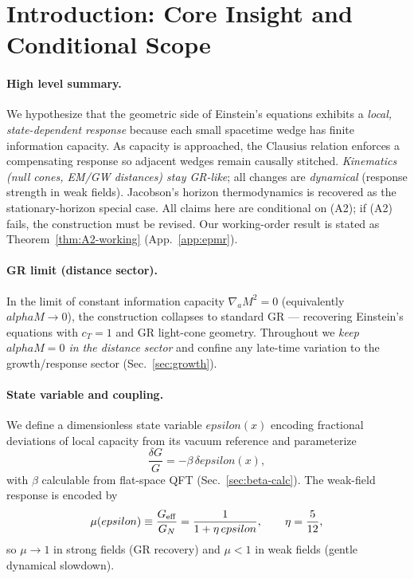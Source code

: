 \documentclass[aps,prd,onecolumn,superscriptaddress,nofootinbib]{revtex4-2}
\def\alphaM{alphaM}%
\def\eps{epsilon}%
\newcommand{\alphaM}{\alpha_M}
\newcommand{\eps}{\varepsilon}
\begin{document}
\maketitle

\section{Introduction: Core Insight and Conditional Scope}
\label{sec:intro}

\paragraph{High level summary.}
We hypothesize that the geometric side of Einstein’s equations exhibits a \emph{local, state-dependent response} because each small spacetime wedge has finite information capacity. As capacity is approached, the Clausius relation enforces a compensating response so adjacent wedges remain causally stitched. \emph{Kinematics (null cones, EM/GW distances) stay GR-like}; all changes are \emph{dynamical} (response strength in weak fields). Jacobson’s horizon thermodynamics is recovered as the stationary-horizon special case. All claims here are conditional on (A2); if (A2) fails, the construction must be revised. Our working-order result is stated as Theorem~\ref{thm:A2-working} (App.~\ref{app:epmr}).

\paragraph{GR limit (distance sector).}
In the limit of constant information capacity $\nabla_a M^2=0$ (equivalently $\alphaM\to 0$), the construction collapses to standard GR --- recovering Einstein’s equations with $c_T=1$ and GR light-cone geometry. Throughout we \emph{keep $\alphaM=0$ in the distance sector} and confine any late-time variation to the growth/response sector (Sec.~\ref{sec:growth}).

\paragraph{State variable and coupling.}
We define a dimensionless state variable $\eps(x)$ encoding fractional deviations of local capacity from its vacuum reference and parameterize
\begin{equation}
\label{eq:deltaG}
\frac{\delta G}{G} = -\beta\,\delta\eps(x),
\end{equation}
with $\beta$ calculable from flat-space QFT (Sec.~\ref{sec:beta-calc}). The weak-field response is encoded by
\begin{equation}
\label{eq:mu-def}
\mu(\eps)\equiv\frac{G_{\rm eff}}{G_N}=\frac{1}{1+\eta\,\eps},
\qquad \eta=\frac{5}{12},
\end{equation}
so $\mu\to 1$ in strong fields (GR recovery) and $\mu<1$ in weak fields (gentle dynamical slowdown).
\end{document}
